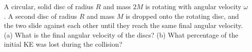 A circular, solid disc of radius $R$ and mass $2M$ is rotating with
angular velocity $\omega$. A second disc of radius $R$ and mass $M$
is dropped onto the rotating disc, and the two slide against each
other until they reach the same final angular velocity.\\
%
(a) What is the final angular velocity of the discs?\answercheck\hwendpart
%
(b) What percentage of the initial KE was lost during the collision?\answercheck
